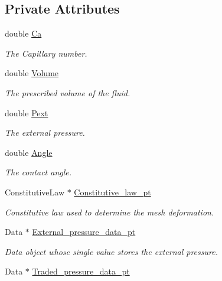 \subsection*{Private Attributes}
\begin{DoxyCompactItemize}
\item 
double \hyperlink{classPseudoSolidCapProblem_ad29a43062d88106c495d407abeddd88d}{Ca}
\begin{DoxyCompactList}\small\item\em The Capillary number. \end{DoxyCompactList}\item 
double \hyperlink{classPseudoSolidCapProblem_a49945d8e5740977a72c63e333a65293f}{Volume}
\begin{DoxyCompactList}\small\item\em The prescribed volume of the fluid. \end{DoxyCompactList}\item 
double \hyperlink{classPseudoSolidCapProblem_afbcfe3a5a05d191c44815681e4b621d0}{Pext}
\begin{DoxyCompactList}\small\item\em The external pressure. \end{DoxyCompactList}\item 
double \hyperlink{classPseudoSolidCapProblem_a51dfbd14a2cca78dc0efe6740337a22b}{Angle}
\begin{DoxyCompactList}\small\item\em The contact angle. \end{DoxyCompactList}\item 
Constitutive\+Law $\ast$ \hyperlink{classPseudoSolidCapProblem_a9eb1383956f3448a8c2e163aa2db72d7}{Constitutive\+\_\+law\+\_\+pt}
\begin{DoxyCompactList}\small\item\em Constitutive law used to determine the mesh deformation. \end{DoxyCompactList}\item 
Data $\ast$ \hyperlink{classPseudoSolidCapProblem_a51ac066b9117f30679fef658ff66d981}{External\+\_\+pressure\+\_\+data\+\_\+pt}
\begin{DoxyCompactList}\small\item\em Data object whose single value stores the external pressure. \end{DoxyCompactList}\item 
Data $\ast$ \hyperlink{classPseudoSolidCapProblem_a55491b1b87f858b8d711a362f4c70838}{Traded\+\_\+pressure\+\_\+data\+\_\+pt}

\end{DoxyCompactItemize}
